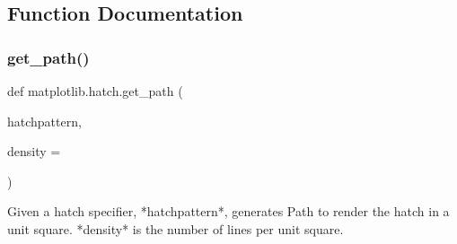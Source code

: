 \subsection{Function Documentation}
\mbox{\label{namespacematplotlib_1_1hatch_afa103984b79e9df2cd8a6a5d5f923b0b}} 
\subsubsection{\texorpdfstring{get\+\_\+path()}{get\_path()}}
{\footnotesize\ttfamily def matplotlib.\+hatch.\+get\+\_\+path (\begin{DoxyParamCaption}\item[{}]{hatchpattern,  }\item[{}]{density = {} }\end{DoxyParamCaption})}

\begin{DoxyVerb}Given a hatch specifier, *hatchpattern*, generates Path to render
the hatch in a unit square.  *density* is the number of lines per
unit square.
\end{DoxyVerb}
 